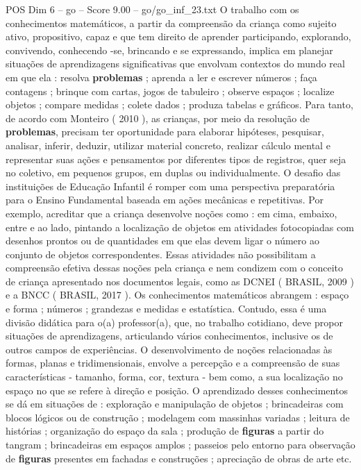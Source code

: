 \begin{textsample}{POS Dim 6 – go – Score 9.00 – go/go\_inf\_23.txt}
O trabalho com os conhecimentos matemáticos, a partir da compreensão da criança como sujeito ativo, propositivo, capaz e que tem direito de aprender participando, explorando, convivendo, conhecendo -se, brincando e se expressando, implica em planejar situações de aprendizagens significativas que envolvam contextos do mundo real em que ela : resolva \textbf{problemas} ; aprenda a ler e escrever números ; faça contagens ; brinque com cartas, jogos de tabuleiro ; observe espaços ; localize objetos ; compare medidas ; colete dados ; produza tabelas e gráficos.
Para tanto, de acordo com Monteiro ( 2010 ), as crianças, por meio da resolução de \textbf{problemas}, precisam ter oportunidade para elaborar hipóteses, pesquisar, analisar, inferir, deduzir, utilizar material concreto, realizar cálculo mental e representar suas ações e pensamentos por diferentes tipos de registros, quer seja no coletivo, em pequenos grupos, em duplas ou individualmente.
O desafio das instituições de Educação Infantil é romper com uma perspectiva preparatória para o Ensino Fundamental baseada em ações mecânicas e repetitivas.
Por exemplo, acreditar que a criança desenvolve noções como : em cima, embaixo, entre e ao lado, pintando a localização de objetos em atividades fotocopiadas com desenhos prontos ou de quantidades em que elas devem ligar o número ao conjunto de objetos correspondentes.
Essas atividades não possibilitam a compreensão efetiva dessas noções pela criança e nem condizem com o conceito de criança apresentado nos documentos legais, como as DCNEI ( BRASIL, 2009 ) e a BNCC ( BRASIL, 2017 ).
Os conhecimentos matemáticos abrangem : espaço e forma ; números ; grandezas e medidas e estatística.
Contudo, essa é uma divisão didática para o(a) professor(a), que, no trabalho cotidiano, deve propor situações de aprendizagens, articulando vários conhecimentos, inclusive os de outros campos de experiências.
O desenvolvimento de noções relacionadas às formas, planas e tridimensionais, envolve a percepção e a compreensão de suas características - tamanho, forma, cor, textura - bem como, a sua localização no espaço no que se refere à direção e posição.
O aprendizado desses conhecimentos se dá em situações de : exploração e manipulação de objetos ; brincadeiras com blocos lógicos ou de construção ; modelagem com massinhas variadas ; leitura de histórias ; organização do espaço da sala ; produção de \textbf{figuras} a partir do tangram ; brincadeiras em espaços amplos ; passeios pelo entorno para observação de \textbf{figuras} presentes em fachadas e construções ; apreciação de obras de arte etc.

\end{textsample}
